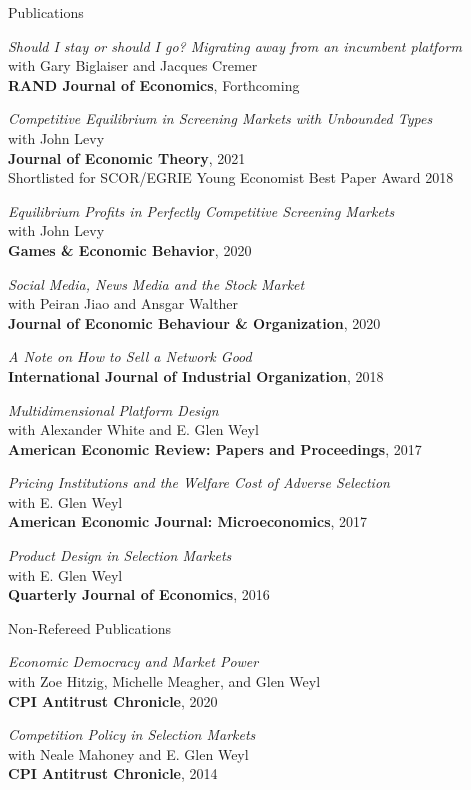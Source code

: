 \documentclass{resume}
\begin{document}
\begin{rSection}{Publications}

\emph{Should I stay or should I go? Migrating away from an incumbent platform}\\ 
with Gary Biglaiser and Jacques Cremer \\ 
\textbf{RAND Journal of Economics}, Forthcoming

\emph{Competitive Equilibrium in Screening Markets with Unbounded Types}\\ 
with John Levy \\
\textbf{Journal of Economic Theory}, 2021
\\ Shortlisted for SCOR/EGRIE Young Economist Best Paper Award 2018

\emph{Equilibrium Profits in Perfectly Competitive Screening Markets}\\
with John Levy \\
\textbf{Games \& Economic Behavior}, 2020

\emph{Social Media, News Media and the Stock Market}\\ 
with Peiran Jiao and Ansgar Walther \\
\textbf{Journal of Economic Behaviour \& Organization}, 2020

\emph{A Note on How to Sell a Network Good} \\
\textbf{International Journal of Industrial Organization}, 2018

\emph{Multidimensional Platform Design}\\ 
with Alexander White and E. Glen Weyl \\
\textbf{American Economic Review: Papers and Proceedings}, 2017

\emph{Pricing Institutions and the Welfare Cost of Adverse Selection}\\
 with E. Glen Weyl \\
\textbf{American Economic Journal: Microeconomics}, 2017

\emph{Product Design in Selection Markets}\\
 with E. Glen Weyl \\ 
\textbf{Quarterly Journal of Economics}, 2016

\end{rSection}






\begin{rSection}{Non-Refereed Publications}
	
\emph{Economic Democracy and Market Power}\\
with Zoe Hitzig, Michelle Meagher, and Glen Weyl \\ 
\textbf{CPI Antitrust Chronicle}, 2020


\emph{Competition Policy in Selection Markets}\\ 
with Neale Mahoney and E. Glen Weyl \\ 
\textbf{CPI Antitrust Chronicle}, 2014

\end{rSection}
\end{document}
